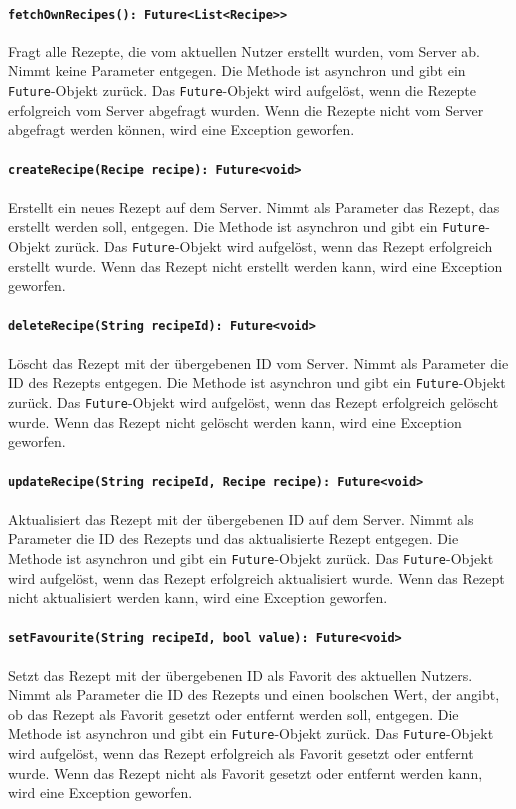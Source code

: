 \documentclass[parskip=full]{scrartcl}
\begin{document}
\paragraph{\texttt{fetchOwnRecipes(): Future<List<Recipe>>}}
Fragt alle Rezepte, die vom aktuellen Nutzer erstellt wurden, vom Server ab. Nimmt keine Parameter entgegen. Die Methode ist asynchron und gibt ein \texttt{Future}-Objekt zurück. Das \texttt{Future}-Objekt wird aufgelöst, wenn die Rezepte erfolgreich vom Server abgefragt wurden. Wenn die Rezepte nicht vom Server abgefragt werden können, wird eine Exception geworfen.
\paragraph{\texttt{createRecipe(Recipe recipe): Future<void>}}
Erstellt ein neues Rezept auf dem Server. Nimmt als Parameter das Rezept, das erstellt werden soll, entgegen. Die Methode ist asynchron und gibt ein \texttt{Future}-Objekt zurück. Das \texttt{Future}-Objekt wird aufgelöst, wenn das Rezept erfolgreich erstellt wurde. Wenn das Rezept nicht erstellt werden kann, wird eine Exception geworfen.
\paragraph{\texttt{deleteRecipe(String recipeId): Future<void>}}
Löscht das Rezept mit der übergebenen ID vom Server. Nimmt als Parameter die ID des Rezepts entgegen. Die Methode ist asynchron und gibt ein \texttt{Future}-Objekt zurück. Das \texttt{Future}-Objekt wird aufgelöst, wenn das Rezept erfolgreich gelöscht wurde. Wenn das Rezept nicht gelöscht werden kann, wird eine Exception geworfen.
\paragraph{\texttt{updateRecipe(String recipeId, Recipe recipe): Future<void>}}
Aktualisiert das Rezept mit der übergebenen ID auf dem Server. Nimmt als Parameter die ID des Rezepts und das aktualisierte Rezept entgegen. Die Methode ist asynchron und gibt ein \texttt{Future}-Objekt zurück. Das \texttt{Future}-Objekt wird aufgelöst, wenn das Rezept erfolgreich aktualisiert wurde. Wenn das Rezept nicht aktualisiert werden kann, wird eine Exception geworfen.
\paragraph{\texttt{setFavourite(String recipeId, bool value): Future<void>}}
Setzt das Rezept mit der übergebenen ID als Favorit des aktuellen Nutzers. Nimmt als Parameter die ID des Rezepts und einen boolschen Wert, der angibt, ob das Rezept als Favorit gesetzt oder entfernt werden soll, entgegen. Die Methode ist asynchron und gibt ein \texttt{Future}-Objekt zurück. Das \texttt{Future}-Objekt wird aufgelöst, wenn das Rezept erfolgreich als Favorit gesetzt oder entfernt wurde. Wenn das Rezept nicht als Favorit gesetzt oder entfernt werden kann, wird eine Exception geworfen.
\newpage
\end{document}
